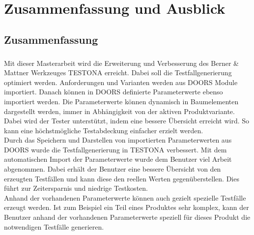 \chapter{Zusammenfassung und Ausblick}\label{chp:zusammenfassung}



\newpage
\section{Zusammenfassung}
\paragraph{}
Mit dieser Masterarbeit wird die Erweiterung und Verbesserung des Berner \& Mattner Werkzeuges TESTONA erreicht. Dabei soll die Testfallgenerierung optimiert werden. Anforderungen und Varianten werden aus DOORS Module importiert. Danach können in DOORS definierte Parameterwerte ebenso importiert werden. Die Parameterwerte können dynamisch in Baumelementen dargestellt werden, immer in Abhängigkeit von der aktiven Produktvariante. Dabei wird der Tester unterstützt, indem eine bessere Übersicht erreicht wird. So kann eine höchstmögliche Testabdeckung einfacher erzielt werden.\\


Durch das Speichern und Darstellen von importierten Parameterwerten aus DOORS wurde die Testfallgenerierung in TESTONA verbessert. Mit dem automatischen Import der Parameterwerte wurde dem Benutzer viel Arbeit abgenommen. Dabei erhält der Benutzer eine bessere Übersicht von den erzeugten Testfällen und kann diese den reellen Werten gegenüberstellen. Dies führt zur Zeitersparnis und niedrige Testkosten.\\


Anhand der vorhandenen Parameterwerte können auch gezielt spezielle Testfälle erzeugt werden. Ist zum Beispiel ein Teil eines Produktes sehr komplex, kann der Benutzer anhand der vorhandenen Parameterwerte speziell für dieses Produkt die notwendigen Testfälle generieren.\\


